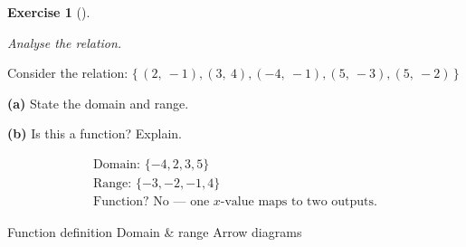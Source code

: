 \documentclass[
  letterpaper,
  DIV=11,
  numbers=noendperiod]{scrreprt}
\theoremstyle{definition}
\newtheorem{exercise}{Exercise}[chapter]
\theoremstyle{remark}
\begin{document}
\begin{exercise}[]\protect\hypertarget{exr-u7-2}{}\label{exr-u7-2}

\emph{Analyse the relation.}

Consider the relation:
\(\{\, (2,\ -1), (3,\ 4), (-4,\ -1), (5,\ -3), (5,\ -2) \,\}\)

\textbf{(a)} State the domain and range.

\textbf{(b)} Is this a function? Explain.

\begin{tcolorbox}[enhanced jigsaw, opacitybacktitle=0.6, coltitle=black, arc=.35mm, colframe=quarto-callout-tip-color-frame, colback=white, bottomrule=.15mm, left=2mm, colbacktitle=quarto-callout-tip-color!10!white, titlerule=0mm, opacityback=0, title=\textcolor{quarto-callout-tip-color}{\faLightbulb}\hspace{0.5em}{🔍 View Solution}, leftrule=.75mm, breakable, rightrule=.15mm, bottomtitle=1mm, toptitle=1mm, toprule=.15mm]

\[
\begin{aligned}
\text{Domain: } \{-4, 2, 3, 5\} \\[4pt] \text{Range: } \{-3, -2, -1, 4\} \\[4pt] \text{Function? No — one $x$-value maps to two outputs.}
\end{aligned}
\]

\end{tcolorbox}

{Function definition} {Domain \& range} {Arrow diagrams}

\end{exercise}
\end{document}

